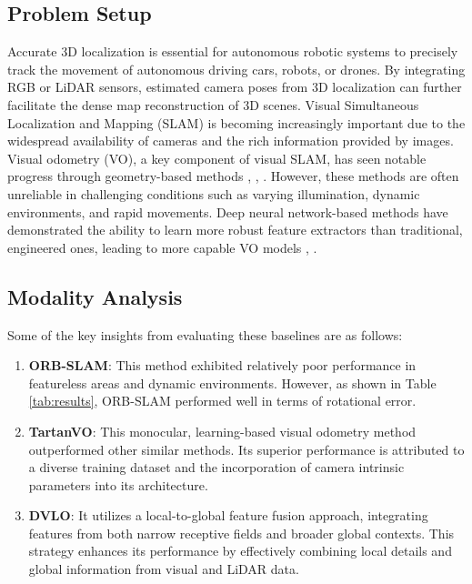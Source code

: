 \documentclass[11pt,a4paper]{article}
\begin{document}
\subsection{Problem Setup}
Accurate 3D localization is essential for autonomous robotic systems to precisely track the movement of autonomous driving cars, robots, or drones. By integrating RGB or LiDAR sensors, estimated camera poses from 3D localization can further facilitate the dense map reconstruction of 3D scenes. Visual Simultaneous Localization and Mapping (SLAM) is becoming increasingly important due to the widespread availability of cameras and the rich information provided by images. Visual odometry (VO), a key component of visual SLAM, has seen notable progress through geometry-based methods \cite{lsd-slam}, \cite{orb-slam}, \cite{spa-odom}. However, these methods are often unreliable in challenging conditions such as varying illumination, dynamic environments, and rapid movements. Deep neural network-based methods have demonstrated the ability to learn more robust feature extractors than traditional, engineered ones, leading to more capable VO models \cite{vo-dnn}, \cite{sfm-net}. 


\subsection{Modality Analysis}
Some of the key insights from evaluating these baselines are as follows:
\begin{enumerate}
  \item \textbf{ORB-SLAM}:  This method exhibited relatively poor performance in featureless areas and dynamic environments. However, as shown in Table \ref{tab:results}, ORB-SLAM performed well in terms of rotational error.
  \item \textbf{TartanVO}: This monocular, learning-based visual odometry method outperformed other similar methods. Its superior performance is attributed to a diverse training dataset and the incorporation of camera intrinsic parameters into its architecture.
  \item \textbf{DVLO}: It utilizes a local-to-global feature fusion approach, integrating features from both narrow receptive fields and broader global contexts. This strategy enhances its performance by effectively combining local details and global information from visual and LiDAR data.
\end{enumerate}
\end{document}
